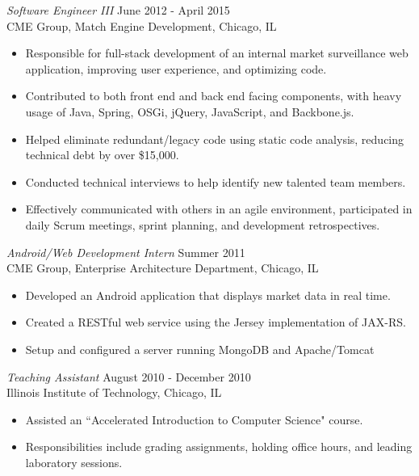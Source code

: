 \documentclass[margin]{res}
\begin{document}
\begin{resume}
                {\sl Software Engineer III} \hfill June 2012 - April 2015 \\
                CME Group, Match Engine Development, Chicago, IL
                 \begin{itemize}  \itemsep -2pt %
                 \item Responsible for full-stack development of an internal market surveillance web application, improving user experience, and optimizing code.
                 \item Contributed to both front end and back end facing components, with heavy usage of Java, Spring, OSGi, jQuery, JavaScript, and Backbone.js.
                 \item Helped eliminate redundant/legacy code using static code analysis, reducing technical debt by over \$15,000.
                 \item Conducted technical interviews to help identify new talented team members.
                 \item Effectively communicated with others in an agile environment, participated in daily Scrum meetings, sprint planning, and development retrospectives.
                \end{itemize}

                {\sl Android/Web Development Intern} \hfill            Summer 2011 \\
                CME Group, Enterprise Architecture Department, Chicago, IL
                 \begin{itemize}  \itemsep -2pt %
                 \item Developed an Android application that displays market data in real time.
                 \item Created a RESTful web service using the Jersey implementation of JAX-RS.
                 \item Setup and configured a server running MongoDB and Apache/Tomcat
                 \end{itemize}

                {\sl Teaching Assistant} \hfill        August 2010 - December 2010 \\
                Illinois Institute of Technology, Chicago, IL
                  \begin{itemize}
                   \item Assisted an ``Accelerated Introduction to Computer Science" course.
                   \item Responsibilities include grading assignments, holding office hours, and leading laboratory sessions.
                   \end{itemize}


\end{resume}
\end{document}
